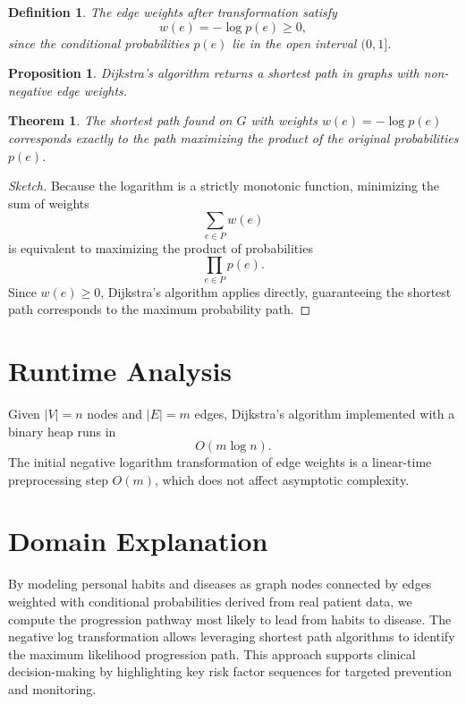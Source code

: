 \documentclass[11pt]{article}
\newtheorem{theorem}{Theorem}
\newtheorem{proposition}{Proposition}
\newtheorem{definition}{Definition}
\begin{document}
\begin{definition}
The edge weights after transformation satisfy
\[
w(e) = -\log p(e) \geq 0,
\]
since the conditional probabilities \(p(e)\) lie in the open interval \((0,1]\).
\end{definition}

\begin{proposition}
Dijkstra's algorithm returns a shortest path in graphs with non-negative edge weights.
\end{proposition}

\begin{theorem}
The shortest path found on \(G\) with weights \(w(e) = -\log p(e)\) corresponds exactly to the path maximizing the product of the original probabilities \(p(e)\).
\end{theorem}

\begin{proof}[Sketch]
Because the logarithm is a strictly monotonic function, minimizing the sum of weights
\[
\sum_{e \in P} w(e)
\]
is equivalent to maximizing the product of probabilities
\[
\prod_{e \in P} p(e).
\]
Since \(w(e) \geq 0\), Dijkstra’s algorithm applies directly, guaranteeing the shortest path corresponds to the maximum probability path.
\end{proof}

\section{Runtime Analysis}
Given \(|V| = n\) nodes and \(|E| = m\) edges, Dijkstra's algorithm implemented with a binary heap runs in
\[
O(m \log n).
\]
The initial negative logarithm transformation of edge weights is a linear-time preprocessing step \(O(m)\), which does not affect asymptotic complexity.

\section{Domain Explanation}
By modeling personal habits and diseases as graph nodes connected by edges weighted with conditional probabilities derived from real patient data, we compute the progression pathway most likely to lead from habits to disease. The negative log transformation allows leveraging shortest path algorithms to identify the maximum likelihood progression path. This approach supports clinical decision-making by highlighting key risk factor sequences for targeted prevention and monitoring.
\end{document}
